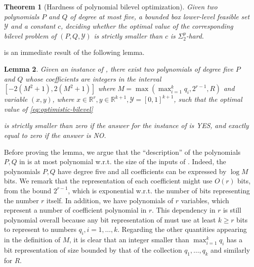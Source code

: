 \documentclass{article}
\newcommand*{\cY}{\mathcal{Y}}
\newcommand*{\RR}{\mathbb{R}}
\newcommand{\argmin}{\arg\min}
\newcommand{\firstvar}{x}
\newcommand{\secondvar}{y}
\newcommand{\existleveltwo}{\Sigma_2^p}
\newcommand{\valoptim}{\varphi_o}
\theoremstyle{plain}
\newtheorem{theorem}{Theorem}[section]
\newtheorem{lemma}[theorem]{Lemma}
\theoremstyle{definition}
\begin{document}
\begin{theorem}[Hardness of polynomial bilevel optimization]
    \label{theorem:hardness2}
    Given two polynomials $P$ and $Q$ of degree at most five, a bounded box lower-level feasible set $\cY$ and a constant $c$, deciding whether the optimal value of the corresponding bilevel problem of $(P,Q,\cY)$ is \emph{strictly} smaller than $c$ is $\existleveltwo$-hard.
\end{theorem}
 is an immediate result of the following lemma.
\begin{lemma}
    \label{lemma:hardness-bounded}
    Given an instance of , there exist two polynomials of degree five $P$ and $Q$ whose coefficients are integers in the interval $[-2(M^2 + 1), 2(M^2 + 1)]$ where $M = \max(\max_{i = 1}^k q_i, 2^{r-1}, R)$ and variable $(\firstvar,\secondvar)$, where $\firstvar \in \RR^{r}, \secondvar \in \RR^{k + 1}, \cY = [0,1]^{k+1}$, such that the optimal value of \eqref{eq:optimistic-bilevel}  

    is strictly smaller than zero if the answer for the instance of  is YES, and exactly equal to zero if the answer is NO. 
\end{lemma}

Before proving the lemma, we argue that the ``description'' of the polynomials $P,Q$ in  is at most polynomial w.r.t. the size of the inputs of . Indeed, the polynomials $P,Q$ have degree five and all coefficients can be expressed by $\log M$ bits. We remark that the representation of each coefficient might use $O(r)$ bits, from the bound $2^{r-1}$, which is exponential w.r.t. the number of bits representing the number $r$ itself. In addition, we have polynomials of $r$ variables, which represent a number of coefficient polynomial in $r$. This dependency in $r$ is still polynomial overall because any bit representation of  must use at least $k \geq r$ bits to represent to numbers $q_i, i = 1, \ldots, k$. Regarding the other quantities appearing in the definition of $M$, it is clear that an integer smaller than $\max_{i = 1}^k q_i$ has a bit representation of size bounded by that of the collection $q_1,\ldots, q_k$ and similarly for $R$.
\end{document}
